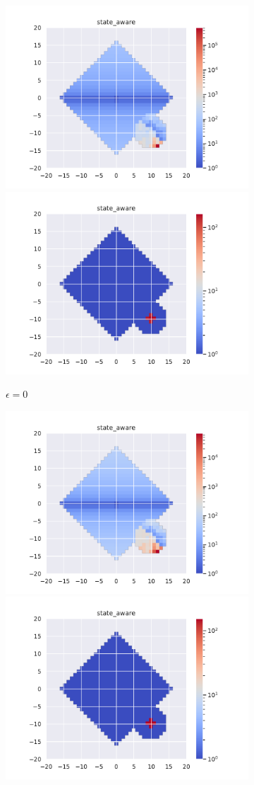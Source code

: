 \documentclass[runningheads]{llncs}
\begin{document}
\begin{figure}[H]
	\centering
	\begin{subfigure}[b]{\linewidth}
		\centering
		\includegraphics[width=0.49\linewidth]{img/epsilon/0/updates_state_aware.pdf}
		\includegraphics[width=0.49\linewidth]{img/epsilon/0/occupations_state_aware.pdf}
		\caption{$\epsilon=0$}
	\end{subfigure}
	\begin{subfigure}[b]{\linewidth}
		\centering
		\includegraphics[width=0.49\linewidth]{img/epsilon/1e-2/updates_state_aware.pdf}
		\includegraphics[width=0.49\linewidth]{img/epsilon/1e-2/occupations_state_aware.pdf}

\end{subfigure}
\end{figure}
\end{document}
